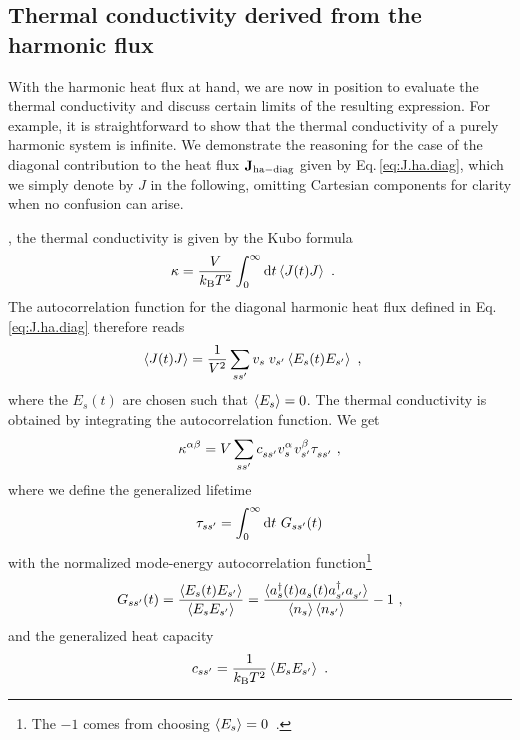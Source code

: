 \subsection{Thermal conductivity derived from the harmonic flux}
{With the harmonic heat flux at hand}, we are now in position to evaluate the thermal conductivity and discuss certain limits of the resulting expression. For example, it is straightforward to show that the thermal conductivity of a purely harmonic system is infinite. 
We demonstrate the reasoning for the case of the diagonal contribution to the heat flux ${\bf J}_{\rm ha-diag}$ given by Eq.\,\eqref{eq:J.ha.diag}, which we simply denote by $J$ in the following, omitting Cartesian components for clarity when no confusion can arise.

, the thermal conductivity is given by the Kubo formula
\begin{align}
	\kappa
		&=
		\frac{V}{k_{\rm B} T^2} \int_{0}^{\infty} 
		{\rm d} t \braket{J (t) J} ~.
\end{align}
The autocorrelation function for the diagonal harmonic heat flux defined in Eq.\,\eqref{eq:J.ha.diag} therefore reads
\begin{align}
	\braket{J(t) J} 
		&= \frac{1}{V^2} \sum_{ss'} v_{\fP s} v_{s'}
			\braket{E_s (t) E_{s'}}~,
	\label{eq:ha.kappa.dJ.corr}
\end{align}
where the $E_s (t)$ are chosen such that $\braket{E_s} = 0$. The thermal conductivity is obtained by integrating the autocorrelation function. We get
\begin{align}
	\kappa^{\alpha \beta}
		= V \sum_{ss'} \fD c_{ss'} v^\alpha_{\fP s} v^\beta_{s'} \fD \tau_{ss'}~,
	\label{eq:kappa_ss}
\end{align}
where we define the generalized lifetime
\begin{align}
	\tau_{ss'} 
		=	\int_{0}^{\infty} \d t ~ G_{ss'} (t)
	\label{eq:tau_ss}
\end{align}
with the normalized mode-energy autocorrelation function\footnote{The $-1$ comes from choosing $\braket{E_s} =0$~.}
\begin{align}
	G_{ss'} (t)
		= \frac{\braket{E_s (t) E_{s'}}}{\braket{E_s E_{s'}}}
	  = \frac{\braket{\D a_s (t) \fD{a}_s (t) \D a_{s'} \fD a_{s'}}}{\braket{n_s} \braket{n_{s'}}} - 1~,
	\label{eq:G_ss}
\end{align}
and the generalized heat capacity
\begin{align}
	c_{ss'} = \frac{1}{k_{\rm B} T^2} \braket{E_s E_{s'}}~.
	\label{c_ss}
\end{align}

